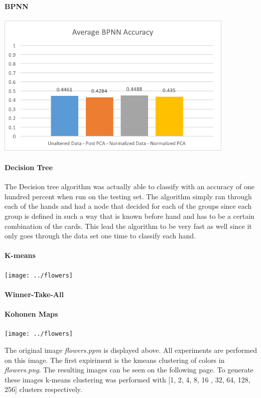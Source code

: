 \documentclass{article}
\begin{document}
\paragraph{BPNN}

\centerline{\includegraphics[width = 4.5in]{images/bpnn-results}}

\paragraph{Decision Tree}
The Decision tree algorithm was actually able to classify with an accuracy of one hundred percent when run on the testing set. The algorithm simply ran through each of the hands and had a node that decided for each of the groups since each group is defined in such a way that is known before hand and has to be a certain combination of the cards. This lead the algorithm to be very fast as well since it only goes through the data set one time to classify each hand.



\paragraph{K-means}

\centerline{\texttt{[image: ../flowers]}}

\paragraph{Winner-Take-All}
\paragraph{Kohonen Maps}

\centerline{\texttt{[image: ../flowers]}}
The original image \textit{flowers.ppm} is displayed above. All experiments
are performed on this image. The first expiriment is the kmeans clustering
of colors in \textit{flowers.png}. The resulting images can be seen on the following page. To generate these images k-means clustering was performed with [1, 2, 4, 8, 16
, 32, 64, 128, 256] clusters respectively.
\end{document}
